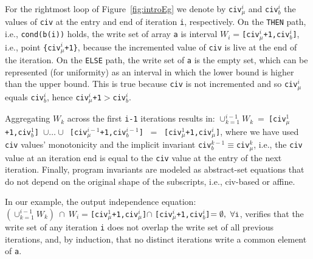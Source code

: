 \documentclass{sig-alternate}
\begin{document}
For the rightmost loop of Figure~\ref{fig:introEg} we denote by 
{\tt civ$_\mu^i$} and {\tt civ$_b^i$} the values of {\tt civ} 
at the entry and end of iteration {\tt i}, respectively.
%
On the {\tt THEN} path, i.e., {\tt cond(b(i))} holds, the write set 
of array {\tt a} is interval $W_i=${\tt [civ$_\mu^i$+1,civ$_b^i$]}, 
i.e., point {\tt \{civ$_\mu^i$+1\}}, because the incremented value 
of {\tt civ} is live at the end of the iteration. 
%
On the {\tt ELSE} path, the write set of {\tt a} is the empty set,
which can be represented (for uniformity) as an interval
%
in which the lower bound is higher than the upper bound.
This is true because {\tt civ} is not incremented and so
{\tt civ$_\mu^i$} equals {\tt civ$_b^i$}, hence 
{\tt civ$_\mu^i$+1$ > $civ$_b^i$}.
%

Aggregating $W_k$ across the first {\tt i-1} iterations results in:
$\cup_{k=1}^{i-1}W_k \ = \ ${\tt [civ$_\mu^1$+1,civ$_b^1$]~$\cup\ldots\cup$~[civ$_\mu^{i-1}$+1,civ$_b^{i-1}$]} $\ = \ $ {\tt [civ$_\mu^1$+1,civ$_\mu^i$]}, where we have used {\tt civ} values'
monotonicity and the implicit invariant {\tt civ$_b^{k-1}\equiv$civ$_\mu^{k}$},
i.e., the {\tt civ} value at an iteration end is equal to the {\tt civ}
value at the entry of the next iteration. 
%
%
Finally, program invariants are modeled as abstract-set equations
that do not depend on the original shape of the subscripts, i.e., 
{\sc civ}-based or affine. 

In our example, the output independence equation:\\
$(\cup_{k=1}^{i-1}W_k)~\cap~W_i = ${\tt [civ$_\mu^1$+1,civ$_\mu^i$]}$\cap$
{\tt [civ$_\mu^i$+1,civ$_b^i$]}$ = \emptyset,~\forall \mbox{\tt{}i}$,
verifies that the write set of any iteration {\tt i} does not overlap
the write set of all previous iterations, and, by induction,
that no distinct iterations write a common element of {\tt a}.
\end{document}
